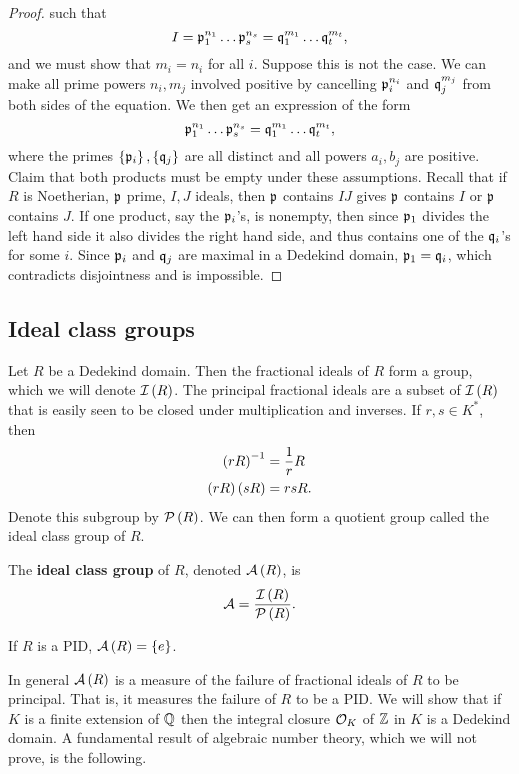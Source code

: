 \begin{proof}
such that
$$ I = \mathfrak{p}_1^{n_1} \dots \mathfrak{p}_s^{n_s} = \mathfrak{q}_1^{m_1} \dots \mathfrak{q}_t^{m_t}, $$
and we must show that $ m_i = n_i $ for all $ i $. Suppose this is not the case. We can make all prime powers $ n_i, m_j $ involved positive by cancelling $ \mathfrak{p}_i^{n_i} $ and $ \mathfrak{q}_j^{m_j} $ from both sides of the equation. We then get an expression of the form
$$ \mathfrak{p}_1^{n_1} \dots \mathfrak{p}_s^{n_s} = \mathfrak{q}_1^{m_1} \dots \mathfrak{q}_t^{m_t}, $$
where the primes $ \left\{ \mathfrak{p}_i \right\}, \left\{ \mathfrak{q}_j \right\} $ are all distinct and all powers $ a_i, b_j $ are positive. Claim that both products must be empty under these assumptions. Recall that if $ R $ is Noetherian, $ \mathfrak{p} $ prime, $ I, J $ ideals, then $ \mathfrak{p} $ contains $ IJ $ gives $ \mathfrak{p} $ contains $ I $ or $ \mathfrak{p} $ contains $ J $. If one product, say the $ \mathfrak{p}_i $'s, is nonempty, then since $ \mathfrak{p}_1 $ divides the left hand side it also divides the right hand side, and thus contains one of the $ \mathfrak{q}_i $'s for some $ i $. Since $ \mathfrak{p}_i $ and $ \mathfrak{q}_j $ are maximal in a Dedekind domain, $ \mathfrak{p}_1 = \mathfrak{q}_i $, which contradicts disjointness and is impossible.
\end{proof}

\pagebreak

\subsection{Ideal class groups}

Let $ R $ be a Dedekind domain. Then the fractional ideals of $ R $ form a group, which we will denote $ \mathcal{I}\left( R \right) $. The principal fractional ideals are a subset of $ \mathcal{I}\left( R \right) $ that is easily seen to be closed under multiplication and inverses. If $ r, s \in K^* $, then
\begin{align*}
\left( rR \right)^{-1} & = \dfrac{1}{r}R \\
\left( rR \right)\left( sR \right) & = rsR.
\end{align*}
Denote this subgroup by $ \mathcal{P}\left( R \right) $. We can then form a quotient group called the ideal class group of $ R $.

\begin{definition}
The \textbf{ideal class group} of $ R $, denoted $ \mathcal{A}\left( R \right) $, is
$$ \mathcal{A} = \dfrac{\mathcal{I}\left( R \right)}{\mathcal{P}\left( R \right)}. $$
\end{definition}

\begin{example*}
If $ R $ is a PID, $ \mathcal{A}\left( R \right) = \left\{ e \right\} $.
\end{example*}

In general $ \mathcal{A}\left( R \right) $ is a measure of the failure of fractional ideals of $ R $ to be principal. That is, it measures the failure of $ R $ to be a PID. We will show that if $ K $ is a finite extension of $ \mathbb{Q} $ then the integral closure $ \mathcal{O}_K $ of $ \mathbb{Z} $ in $ K $ is a Dedekind domain. A fundamental result of algebraic number theory, which we will not prove, is the following.

